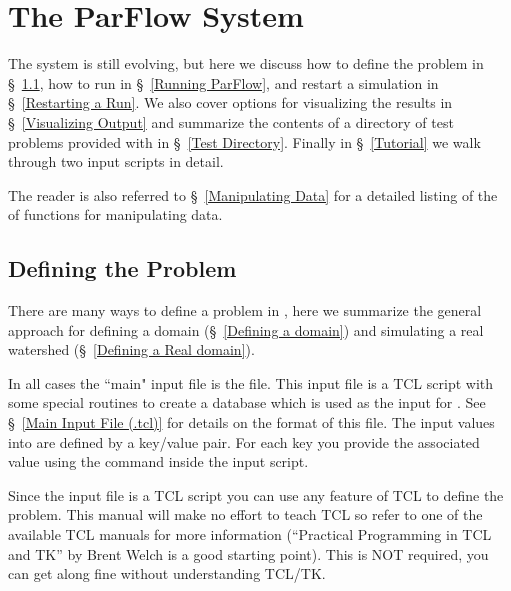 
\chapter{The ParFlow System}
\label{The ParFlow System}

The \parflow{} system is still evolving, but here we discuss how to define the problem in
\S~\ref{Defining the Problem}, how to run \parflow{} in
\S~\ref{Running ParFlow}, and restart a simulation in \S~\ref{Restarting a Run}.
We also cover options for visualizing the results in
\S~\ref{Visualizing Output} and summarize the contents of a directory of test problems 
provided with \parflow{} in \S~\ref{Test Directory}.  Finally in \S~\ref{Tutorial}
we walk through two \parflow{} input scripts in detail. 


The reader is also referred to \S~\ref{Manipulating Data}
for a detailed listing of the of functions for manipulating \parflow{} data.  


\section{Defining the Problem}
\label{Defining the Problem}

There are many ways to define a problem in \parflow{}, here we summarize the general 
approach for defining a domain (\S~\ref{Defining a domain}) and simulating
 a real watershed (\S~\ref{Defining a Real domain}). 

In all cases the ``main" \parflow{} input file is the  file.
This input file is a TCL script with some special routines to
create a database which is used as the input for \parflow{}.
See \S~\ref{Main Input File (.tcl)} for details on the format
of this file.
The input values into \parflow{} are defined by a key/value pair.  For
each key you provide the associated value using the  command
inside the input script. 

Since the input file is a TCL script you can use any feature of TCL to
define the problem.  This manual will make no effort to teach TCL so
refer to one of the available TCL manuals for more information
(``Practical Programming in TCL and TK'' by Brent Welch \cite{welch.95} 
is a good starting point).  
This is NOT required, you can get along fine without understanding TCL/TK.

